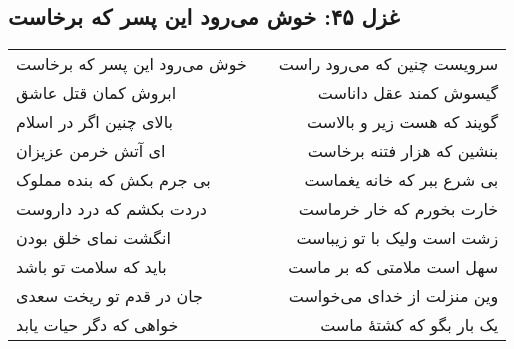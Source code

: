 \begin{center}
\section*{غزل ۴۵: خوش می‌رود این پسر که برخاست}
\label{sec:045}
\begin{longtable}{l p{0.5cm} r}
خوش می‌رود این پسر که برخاست
&&
سرویست چنین که می‌رود راست
\\
ابروش کمان قتل عاشق
&&
گیسوش کمند عقل داناست
\\
بالای چنین اگر در اسلام
&&
گویند که هست زیر و بالاست
\\
ای آتش خرمن عزیزان
&&
بنشین که هزار فتنه برخاست
\\
بی جرم بکش که بنده مملوک
&&
بی شرع ببر که خانه یغماست
\\
دردت بکشم که درد داروست
&&
خارت بخورم که خار خرماست
\\
انگشت نمای خلق بودن
&&
زشت است ولیک با تو زیباست
\\
باید که سلامت تو باشد
&&
سهل است ملامتی که بر ماست
\\
جان در قدم تو ریخت سعدی
&&
وین منزلت از خدای می‌خواست
\\
خواهی که دگر حیات یابد
&&
یک بار بگو که کشتهٔ ماست
\\
\end{longtable}
\end{center}
